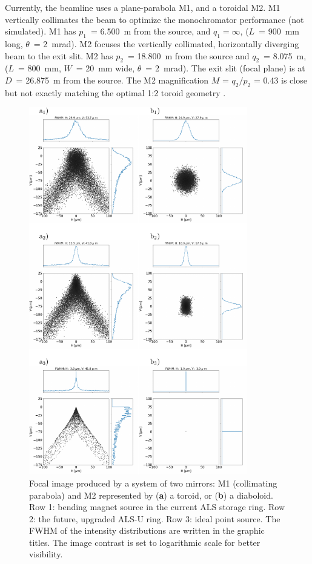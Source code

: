 \documentclass[preprint]{iucr}       %
\begin{document}
Currently, the beamline uses a plane-parabola M1, and a toroidal M2. M1 vertically collimates the beam to optimize the monochromator performance (not simulated). M1 has $p_1$~= \SI{6.500}{\meter} from the source, and $q_1=\infty$, ($L$~= \SI{900}{\milli\meter} long, $\theta$~= \SI{2}{\milli\radian}). M2 focuses the vertically collimated, horizontally diverging beam to the exit slit. M2 has $p_2$~= \SI{18.800}{\meter} from the source and $q_2$~= \SI{8.075}{\meter}, ($L$~= \SI{800}{\milli\meter}, $W$~= \SI{20}{\milli\meter} wide, $\theta$~= \SI{2}{\milli\radian}). The exit slit (focal plane) is at $D$~= \SI{26.875}{\meter} from the source. The M2 magnification $M$ = $q_2/p_2$ = 0.43 is close but not exactly matching the optimal 1:2 toroid geometry \cite{MacDowell2004}.


\begin{figure}\label{fig:als}
\includegraphics[width=0.85\textwidth]{figures/fig4.pdf}
\caption{Focal image produced by a system of two mirrors: M1 (collimating parabola) and M2 represented by (\textbf{a}) a toroid, or (\textbf{b}) a diaboloid. Row 1: bending magnet source in the current ALS storage ring. Row 2: the future, upgraded ALS-U ring. Row 3: ideal point source. The FWHM of the intensity distributions are written in the graphic titles. The image contrast is set to logarithmic scale for better visibility.}
\end{figure}
\end{document}
